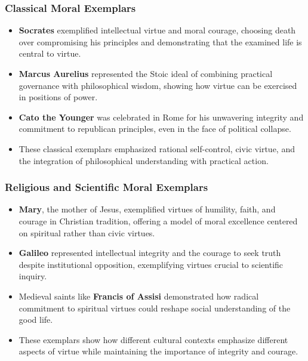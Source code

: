 \documentclass{beamer}
\begin{document}
\begin{frame}
    \frametitle{Classical Moral Exemplars}
    \begin{itemize}
        \item \textbf{Socrates} exemplified intellectual virtue and moral courage, choosing death over compromising his principles and demonstrating that the examined life is central to virtue.
        
        \item \textbf{Marcus Aurelius} represented the Stoic ideal of combining practical governance with philosophical wisdom, showing how virtue can be exercised in positions of power.
        
        \item \textbf{Cato the Younger} was celebrated in Rome for his unwavering integrity and commitment to republican principles, even in the face of political collapse.
        
        \item These classical exemplars emphasized rational self-control, civic virtue, and the integration of philosophical understanding with practical action.
    \end{itemize}
\end{frame}

\begin{frame}
    \frametitle{Religious and Scientific Moral Exemplars}
    \begin{itemize}
        \item \textbf{Mary}, the mother of Jesus, exemplified virtues of humility, faith, and courage in Christian tradition, offering a model of moral excellence centered on spiritual rather than civic virtues.
        
        \item \textbf{Galileo} represented intellectual integrity and the courage to seek truth despite institutional opposition, exemplifying virtues crucial to scientific inquiry.
        
        \item Medieval saints like \textbf{Francis of Assisi} demonstrated how radical commitment to spiritual virtues could reshape social understanding of the good life.
        
        \item These exemplars show how different cultural contexts emphasize different aspects of virtue while maintaining the importance of integrity and courage.
    \end{itemize}
\end{frame}
\end{document}
